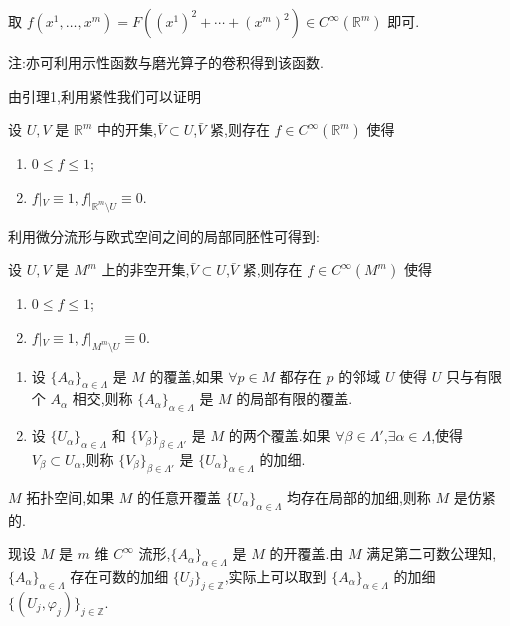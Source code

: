 取 $f(x^1, \ldots, x^m) = F((x^1)^2 + \cdots + (x^m)^2) \in C^\infty(\mathbb{R}^m)$ 即可.

注:亦可利用示性函数与磨光算子的卷积得到该函数.

由引理1,利用紧性我们可以证明

\begin{lemma}[引理2]
设 $U, V$ 是 $\mathbb{R}^m$ 中的开集,$\bar{V} \subset U$,$\bar{V}$ 紧,则存在 $f \in C^\infty(\mathbb{R}^m)$ 使得
\begin{enumerate}
    \item $0 \leq f \leq 1$;
    \item $f|_V \equiv 1, f|_{\mathbb{R}^m \setminus U} \equiv 0$.
\end{enumerate}
\end{lemma}

利用微分流形与欧式空间之间的局部同胚性可得到:

\begin{lemma}[引理3]
设 $U, V$ 是 $M^m$ 上的非空开集,$\bar{V} \subset U$,$\bar{V}$ 紧,则存在 $f \in C^\infty(M^m)$ 使得
\begin{enumerate}
    \item $0 \leq f \leq 1$;
    \item $f|_V \equiv 1, f|_{M^m \setminus U} \equiv 0$.
\end{enumerate}
\end{lemma}

\begin{definition}
\begin{enumerate}
    \item 设 $\{A_\alpha\}_{\alpha \in \Lambda}$ 是 $M$ 的覆盖,如果 $\forall p \in M$ 都存在 $p$ 的邻域 $U$ 使得 $U$ 只与有限个 $A_\alpha$ 相交,则称 $\{A_\alpha\}_{\alpha \in \Lambda}$ 是 $M$ 的局部有限的覆盖.
    \item 设 $\{U_\alpha\}_{\alpha \in \Lambda}$ 和 $\{V_\beta\}_{\beta \in \Lambda'}$ 是 $M$ 的两个覆盖.如果 $\forall \beta \in \Lambda'$,$\exists \alpha \in \Lambda$,使得 $V_\beta \subset U_\alpha$,则称 $\{V_\beta\}_{\beta \in \Lambda'}$ 是 $\{U_\alpha\}_{\alpha \in \Lambda}$ 的加细.
\end{enumerate}
\end{definition}

\begin{definition}
$M$ 拓扑空间,如果 $M$ 的任意开覆盖 $\{U_\alpha\}_{\alpha \in \Lambda}$ 均存在局部的加细,则称 $M$ 是仿紧的.
\end{definition}

现设 $M$ 是 $m$ 维 $C^\infty$ 流形,$\{A_\alpha\}_{\alpha \in \Lambda}$ 是 $M$ 的开覆盖.由 $M$ 满足第二可数公理知,$\{A_\alpha\}_{\alpha \in \Lambda}$ 存在可数的加细 $\{U_j\}_{j \in \mathbb{Z}}$,实际上可以取到 $\{A_\alpha\}_{\alpha \in \Lambda}$ 的加细 $\{(U_j, \varphi_j)\}_{j \in \mathbb{Z}}$.

